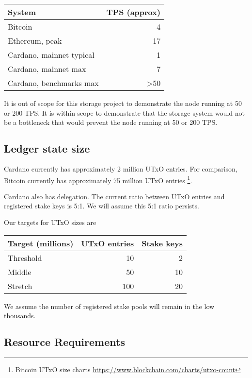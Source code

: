 \documentclass[11pt,a4paper]{article}
\begin{document}
\begin{center}
\begin{tabular}[]{lr}
  System    & TPS (approx) \\
  \toprule
  Bitcoin                  & 4   \\
  Ethereum, peak           & 17  \\
  Cardano, mainnet typical & 1   \\
  Cardano, mainnet max     & 7   \\
  Cardano, benchmarks max  & \textgreater 50   \\
\end{tabular}
\end{center}

It is out of scope for this storage project to demonstrate the node running at
50 or 200 TPS. It is within scope to demonstrate that the storage system would
not be a bottleneck that would prevent the node running at 50 or 200 TPS.

\subsection{Ledger state size}
\label{ledger-state-size}

Cardano currently has approximately 2 million UTxO entries. For comparison,
Bitcoin currently has approximately 75 million UTxO entries%
\footnote{Bitcoin UTxO size charts \url{https://www.blockchain.com/charts/utxo-count}}.

Cardano also has delegation. The current ratio between UTxO entries
and registered stake keys is 5:1. We will assume this 5:1 ratio persists.

Our targets for UTxO sizes are

\begin{center}
\begin{tabular}[]{lrr}
  Target (millions) & UTxO entries & Stake keys \\
  \toprule
  Threshold &  10  &  2 \\
  Middle    &  50  & 10 \\
  Stretch   & 100  & 20
\end{tabular}
\end{center}

We assume the number of registered stake pools will remain in the low thousands.

\subsection{Resource Requirements}
\label{resource-requirements}
\end{document}
